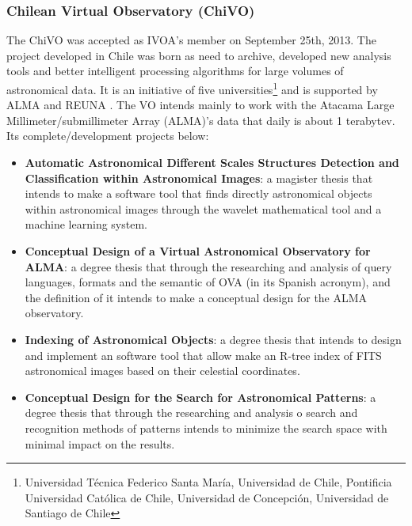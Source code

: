 \subsubsection{Chilean Virtual Observatory (ChiVO)}
The ChiVO \cite{website:chivo-home} was accepted as IVOA's member on September
25th, 2013. The project developed in Chile was born as need to archive,
developed new analysis tools and better intelligent processing algorithms for
large volumes of astronomical data. It is an initiative of five
universities\footnote{Universidad T\'{e}cnica Federico Santa Mar\'{i}a,
Universidad de Chile, Pontificia Universidad Cat\'{o}lica de Chile, Universidad
de Concepci\'{o}n, Universidad de Santiago de Chile} and is supported by ALMA
\cite{webiste:alma-home} and REUNA \cite{website:reuna-home}. The VO intends
mainly to work with the Atacama Large Millimeter/submillimeter Array (ALMA)'s
data that daily is about 1 terabytev. Its complete/development projects below:

\begin{itemize}
\item \textbf{Automatic Astronomical Different Scales Structures Detection and
Classification within Astronomical Images}:
a magister thesis that intends to make a software tool that finds directly
astronomical objects within astronomical images through the wavelet mathematical
tool and a machine learning system.

\item \textbf{Conceptual Design of a Virtual Astronomical Observatory for ALMA}:
a degree thesis that through the researching and analysis of query languages,
formats and the semantic of OVA (in its Spanish acronym), and the definition of
it intends to make a conceptual design for the ALMA observatory.

\item \textbf{Indexing of Astronomical Objects}:
a degree thesis that intends to design and implement an software tool that allow
make an R-tree index of FITS astronomical images based on their celestial
coordinates.

\item  \textbf{Conceptual Design for the Search for Astronomical Patterns}:
 a degree thesis that through the researching and analysis o search and
recognition methods of patterns intends to minimize the search space with
minimal impact on the results. 
\end{itemize}

